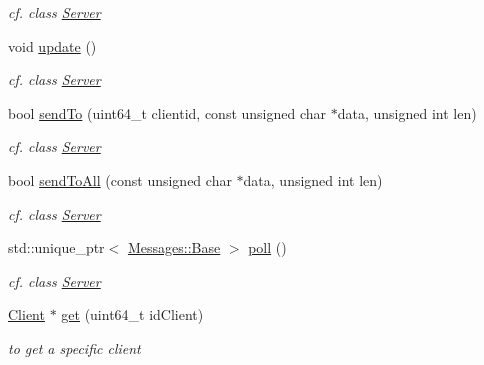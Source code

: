 \begin{DoxyCompactItemize}
\begin{DoxyCompactList}\small\item\em cf. class \hyperlink{class_network_1_1_t_c_p_1_1_server}{Server} \end{DoxyCompactList}\item 
void \hyperlink{class_network_1_1_t_c_p_1_1_server_impl_a7396997a25ce53506c8f8a69cec72774}{update} ()
\begin{DoxyCompactList}\small\item\em cf. class \hyperlink{class_network_1_1_t_c_p_1_1_server}{Server} \end{DoxyCompactList}\item 
\mbox{\label{class_network_1_1_t_c_p_1_1_server_impl_a0517ef8600539522385b82cf0460cbd3}} 
bool \hyperlink{class_network_1_1_t_c_p_1_1_server_impl_a0517ef8600539522385b82cf0460cbd3}{send\+To} (uint64\+\_\+t clientid, const unsigned char $\ast$data, unsigned int len)
\begin{DoxyCompactList}\small\item\em cf. class \hyperlink{class_network_1_1_t_c_p_1_1_server}{Server} \end{DoxyCompactList}\item 
\mbox{\label{class_network_1_1_t_c_p_1_1_server_impl_aebf3e7ba43f65222e14142f3bdaf10f0}} 
bool \hyperlink{class_network_1_1_t_c_p_1_1_server_impl_aebf3e7ba43f65222e14142f3bdaf10f0}{send\+To\+All} (const unsigned char $\ast$data, unsigned int len)
\begin{DoxyCompactList}\small\item\em cf. class \hyperlink{class_network_1_1_t_c_p_1_1_server}{Server} \end{DoxyCompactList}\item 
\mbox{\label{class_network_1_1_t_c_p_1_1_server_impl_acd01852df26c13a59887a9043e339ca1}} 
std\+::unique\+\_\+ptr$<$ \hyperlink{class_network_1_1_messages_1_1_base}{Messages\+::\+Base} $>$ \hyperlink{class_network_1_1_t_c_p_1_1_server_impl_acd01852df26c13a59887a9043e339ca1}{poll} ()
\begin{DoxyCompactList}\small\item\em cf. class \hyperlink{class_network_1_1_t_c_p_1_1_server}{Server} \end{DoxyCompactList}\item 
\hyperlink{class_network_1_1_t_c_p_1_1_client}{Client} $\ast$ \hyperlink{class_network_1_1_t_c_p_1_1_server_impl_a962a14d824fdd5aec78eacb0643b206d}{get} (uint64\+\_\+t id\+Client)
\begin{DoxyCompactList}\small\item\em to get a specific client \end{DoxyCompactList}\end{DoxyCompactItemize}


